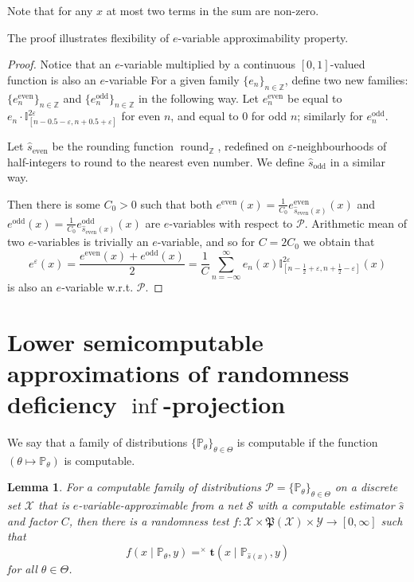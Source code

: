\documentclass{article}
\newtheorem{lemma}{Lemma}
\theoremstyle{definition}
\theoremstyle{definition}
\newcommand{\intnums}{\mathbb{Z}}
\newcommand{\probP}{\mathbb{P}}
\newcommand{\uut}{\mathbf{t}}
\begin{document}
Note that for any $x$ at most two terms in the sum are non-zero.

The proof illustrates flexibility of $e$-variable approximability property.

\begin{proof}
	Notice that an $e$-variable multiplied by a continuous $[0,1]$-valued function is also an $e$-variable
    For a given family $\{e_n\}_{n\in\intnums}$, define two new families: $\{e_n^{\textrm{even}}\}_{n\in\intnums}$ and $\{e_n^{\textrm{odd}}\}_{n\in\intnums}$ in the following way. Let $e_n^{\textrm{even}}$ be equal to $e_n\cdot \mathbb{I}^{2\varepsilon}_{[n-0.5-\varepsilon, n+0.5 +\varepsilon]}$ for even $n$, and equal to $0$ for odd $n$; similarly for $e_n^\textrm{odd}$.

    Let $\hat{s}_\textrm{even}$ be the rounding function $\operatorname{round}_{\intnums}$, redefined on $\varepsilon$-neighbourhoods of half-integers to round to the nearest even number. We define $\hat{s}_\textrm{odd}$ in a similar way.

    Then there is some $C_0 > 0$ such that both $e^\textrm{even}(x)=\frac{1}{C_0}e^\textrm{even}_{\hat{s}_\textrm{even}(x)}(x)$ and $e^\textrm{odd}(x)=\frac{1}{C_0}e^\textrm{odd}_{\hat{s}_\textrm{even}(x)}(x)$ are $e$-variables with respect to $\mathcal{P}$. Arithmetic mean of two $e$-variables is trivially an $e$-variable, and so for $C = 2C_0$ we obtain that
    \[
        e^\varepsilon(x)=\frac{e^\textrm{even}(x) + e^\textrm{odd}(x)}{2} = \frac{1}{C} \sum_{n=-\infty}^\infty e_n(x) \mathbb{I}_{\left[n-\frac{1}{2}+\varepsilon, n + \frac{1}{2}-\varepsilon\right]}^{2\varepsilon}(x)
    \]
    is also an $e$-variable w.r.t. $\mathcal{P}$.
\end{proof}






\section{Lower semicomputable approximations of randomness deficiency $\inf$-projection}\label{sec:rand-def-res}



We say that a family of distributions $\{\probP_\theta\}_{\theta\in\Theta}$ is computable if the function $(\theta \mapsto \probP_\theta)$ is computable.

\begin{lemma}\label{lem:semicomp-test-discrete}
    For a computable family of distributions $\mathcal{P}=\{\probP_\theta\}_{\theta\in\Theta}$ on a discrete set $\mathcal{X}$ that is $e$-variable-approximable from a net $\mathcal{S}$ with a computable estimator $\hat{s}$ and factor $C$, then there is a randomness test $f: \mathcal{X}\times\mathfrak{P}(\mathcal{X}) \times \mathcal{Y} \to [0,\infty]$ such that 
    \[
        f(x\mid\probP_\theta, y) =^\times \uut(x\mid \probP_{\hat{s}(x)}, y)
    \]
    for all $\theta\in\Theta$.
\end{lemma}
\end{document}
